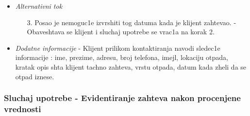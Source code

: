 \documentclass[10 pt]{article}
\begin{document}
\begin{itemize}
			\item\textit{Alternativni tok}
				\begin{enumerate}
					\item [3.] Posao je nemoguc1e izvrshiti tog datuma kada je klijent zahtevao.
- Obaveshtava se klijent i sluchaj upotrebe se vrac1a na korak 2.

					
				\end{enumerate}

			
			\item\textit{Dodatne informacije}
-	Klijent prilikom kontaktiranja navodi sledec1e informacije :
ime, prezime, adresu, broj telefona, imejl, lokaciju otpada, kratak opis shta klijent tachno zahteva, vrstu otpada, datum kada zheli da se otpad iznese.

			
		\end{itemize}
	\newpage
	\subsubsection{Sluchaj upotrebe - Evidentiranje zahteva nakon procenjene vrednosti}
	
\end{document}
